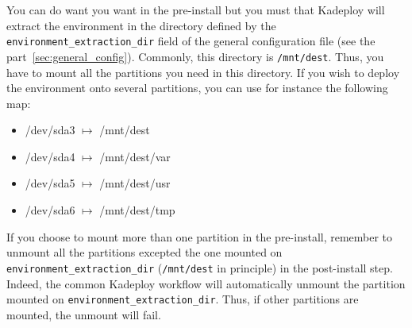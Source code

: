 \documentclass[a4wide,10pt,oneside]{book}
\begin{document}
You can do want you want in the pre-install but you must that Kadeploy will extract the environment in the directory defined by the \texttt{environment\_extraction\_dir} field of the general configuration file (see the part~\ref{sec:general_config}). Commonly, this directory is \texttt{/mnt/dest}. Thus, you have to mount all the partitions you need in this directory. If you wish to deploy the environment onto several partitions, you can use for instance the following map:
\begin{itemize}
\item /dev/sda3 $\mapsto$ /mnt/dest
\item /dev/sda4 $\mapsto$ /mnt/dest/var
\item /dev/sda5 $\mapsto$ /mnt/dest/usr
\item /dev/sda6 $\mapsto$ /mnt/dest/tmp
\end{itemize}

If you choose to mount more than one partition in the pre-install, remember to unmount all the partitions excepted the one mounted on \texttt{environment\_extraction\_dir} (\texttt{/mnt/dest} in principle) in the post-install step. Indeed, the common Kadeploy workflow will automatically unmount the partition mounted on \texttt{environment\_extraction\_dir}. Thus, if other partitions are mounted, the unmount will fail.
\end{document}
